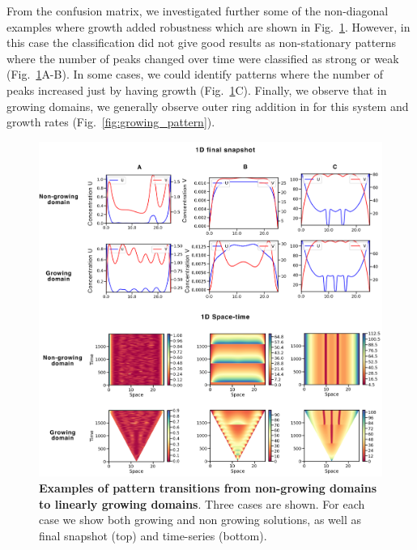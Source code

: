 From the confusion matrix, we investigated further some of the non-diagonal examples where growth added robustness which are shown in Fig.~\ref{fig:interesting_cases_edgegrowth2}.
 However, in this case the classification did not give good results as non-stationary patterns where the number of peaks changed over time were classified as strong or weak (Fig.~\ref{fig:interesting_cases_edgegrowth2}A-B).
In some cases, we could identify patterns where the number of peaks increased just by having growth (Fig.~\ref{fig:interesting_cases_edgegrowth2}C).
Finally, we observe that in growing domains, we generally observe outer ring addition in for this system and growth rates (Fig.~\ref{fig:growing_pattern}).
\begin{figure}[H] %

    \centering
    \begin{adjustbox}{center}
        \includegraphics[width=1\textwidth]{chapters/Chapter 1/interesting_cases_edgegrowth2} %
    \end{adjustbox}
    \caption{\textbf{Examples of pattern transitions from non-growing domains to linearly growing domains}. Three cases are shown. For each case we show both growing and non growing solutions, as well as final snapshot (top) and time-series (bottom).}
    \label{fig:interesting_cases_edgegrowth2} %
\end{figure}

